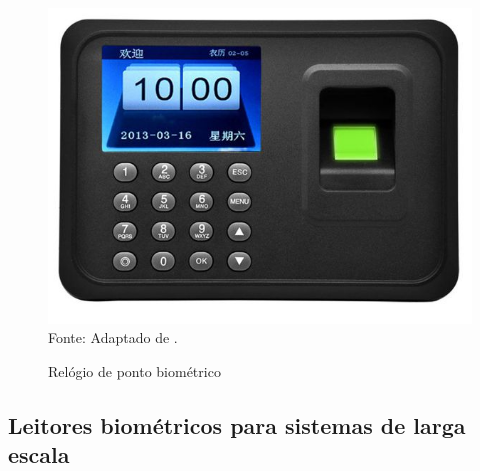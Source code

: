  \begin{figure}[!ht]
  \begin{center}
  \caption{Relógio de ponto biométrico}
  \includegraphics[scale=0.3]{figuras/cap3/fingerprinttimeattendance.jpg}\\
  Fonte: Adaptado de \cite{fingerprinttimeattendance}.
  \label{fingerprinttimeattendance}
  \end{center}
  \end{figure}
  
  
 \subsection{Leitores biométricos para sistemas de larga escala}
  
